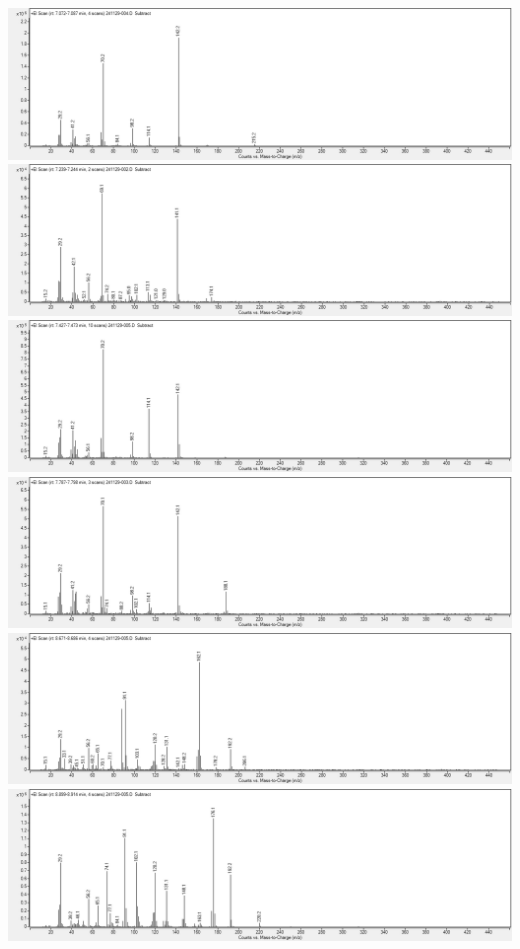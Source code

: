 \includegraphics[width=1\linewidth]{graphics/data/MS/07077.png}
\includegraphics[width=1\linewidth]{graphics/data/MS/07239.png}
\includegraphics[width=1\linewidth]{graphics/data/MS/07468.png}
\includegraphics[width=1\linewidth]{graphics/data/MS/07793.png}
\includegraphics[width=1\linewidth]{graphics/data/MS/08681.png}
\includegraphics[width=1\linewidth]{graphics/data/MS/08909.png}
